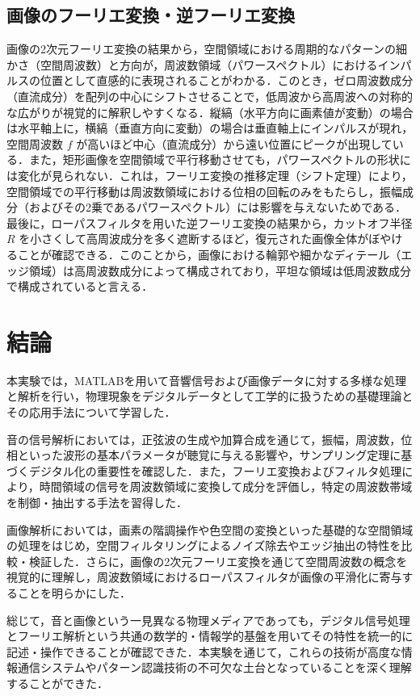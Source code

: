 \documentclass[paper=a4, fontsize=10pt]{jlreq}
\begin{document}
\subsection{画像のフーリエ変換・逆フーリエ変換}
画像の2次元フーリエ変換の結果から，空間領域における周期的なパターンの細かさ（空間周波数）と方向が，周波数領域（パワースペクトル）におけるインパルスの位置として直感的に表現されることがわかる\cite{mathworks_fft2}．このとき，ゼロ周波数成分（直流成分）を配列の中心にシフトさせることで，低周波から高周波への対称的な広がりが視覚的に解釈しやすくなる\cite{mathworks_fftshift}．縦縞（水平方向に画素値が変動）の場合は水平軸上に，横縞（垂直方向に変動）の場合は垂直軸上にインパルスが現れ，空間周波数 $f$ が高いほど中心（直流成分）から遠い位置にピークが出現している．また，矩形画像を空間領域で平行移動させても，パワースペクトルの形状には変化が見られない．これは，フーリエ変換の推移定理（シフト定理）により，空間領域での平行移動は周波数領域における位相の回転のみをもたらし，振幅成分（およびその2乗であるパワースペクトル）には影響を与えないためである．最後に，ローパスフィルタを用いた逆フーリエ変換の結果から，カットオフ半径 $R$ を小さくして高周波成分を多く遮断するほど，復元された画像全体がぼやけることが確認できる．このことから，画像における輪郭や細かなディテール（エッジ領域）は高周波数成分によって構成されており，平坦な領域は低周波数成分で構成されていると言える．

\section{結論}
本実験では，MATLABを用いて音響信号および画像データに対する多様な処理と解析を行い，物理現象をデジタルデータとして工学的に扱うための基礎理論とその応用手法について学習した．

音の信号解析においては，正弦波の生成や加算合成を通じて，振幅，周波数，位相といった波形の基本パラメータが聴覚に与える影響や，サンプリング定理に基づくデジタル化の重要性を確認した．また，フーリエ変換およびフィルタ処理により，時間領域の信号を周波数領域に変換して成分を評価し，特定の周波数帯域を制御・抽出する手法を習得した．

画像解析においては，画素の階調操作や色空間の変換といった基礎的な空間領域の処理をはじめ，空間フィルタリングによるノイズ除去やエッジ抽出の特性を比較・検証した．さらに，画像の2次元フーリエ変換を通じて空間周波数の概念を視覚的に理解し，周波数領域におけるローパスフィルタが画像の平滑化に寄与することを明らかにした．

総じて，音と画像という一見異なる物理メディアであっても，デジタル信号処理とフーリエ解析という共通の数学的・情報学的基盤を用いてその特性を統一的に記述・操作できることが確認できた．本実験を通じて，これらの技術が高度な情報通信システムやパターン認識技術の不可欠な土台となっていることを深く理解することができた．
\end{document}
